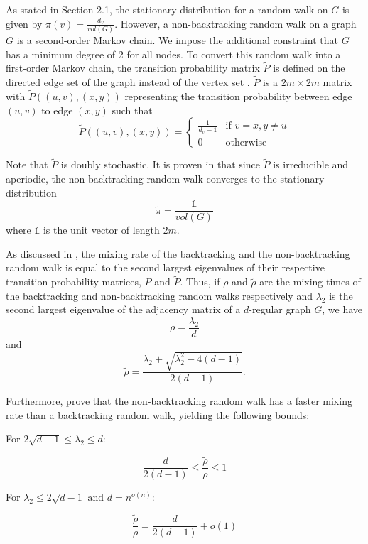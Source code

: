 \documentclass{article} %
\begin{document}
As stated in Section 2.1, the stationary distribution for a random walk on $G$ is given by $\displaystyle\pi(v) = \frac{d_v}{vol(G)}$. However, a non-backtracking random walk on a graph $G$ is a second-order Markov chain. We impose the additional constraint that $G$ has a minimum degree of 2 for all nodes. To convert this random walk into a first-order Markov chain, the transition probability matrix $\tilde P$ is defined on the directed edge set of the graph instead of the vertex set \cite{NBT-Ihara}. $\tilde P$ is a $2m \times 2m$ matrix with $\tilde P((u,v), (x,y))$ representing the transition probability between edge $(u,v)$ to edge $(x,y)$ such that
\[\tilde P((u,v), (x,y)) = 
    \begin{cases} 
        \displaystyle\frac{1}{d_v-1} & \text{if } v = x, y \neq u\\
        0 & \text{otherwise}
    \end{cases}
\]

Note that $\tilde P$ is doubly stochastic. It is proven in \cite{NBT-Ihara} that since $\tilde P$ is irreducible and aperiodic, the non-backtracking random walk converges to the stationary distribution
$$\tilde \pi = \frac{\mathds{1}}{vol(G)}$$
where $\mathds{1}$ is the unit vector of length $2m$.

As discussed in \cite{NBT-Ihara}, the mixing rate of the backtracking and the non-backtracking random walk is equal to the second largest eigenvalues of their respective transition probability matrices, $P$ and $\tilde P$. Thus, if $\rho$ and $\tilde \rho$ are the mixing times of the backtracking and non-backtracking random walks respectively and $\lambda_2$ is the second largest eigenvalue of the adjacency matrix of a $d$-regular graph $G$, we have 
$$\rho = \frac{\lambda_2}{d}$$
and
$$\tilde \rho = \frac{\lambda_2 + \sqrt{\lambda_2^2 - 4(d-1)}}{2(d-1)}.$$

Furthermore, \cite{NBT-Ihara, Alon} prove that the non-backtracking random walk has a faster mixing rate than a backtracking random walk, yielding the following bounds:

\begin{flushleft}
For $2\sqrt{d-1} \leq \lambda_2 \leq d:$
\end{flushleft}
$$\frac{d}{2(d-1)} \leq \frac{\tilde \rho}{\rho} \leq 1$$

\begin{flushleft}
For $\lambda_2 \leq 2\sqrt{d-1} \text{ and } d = n^{o(n)}:$
\end{flushleft}
$$\frac{\tilde \rho}{\rho} = \frac{d}{2(d-1)} + o(1)$$\\
\end{document}

